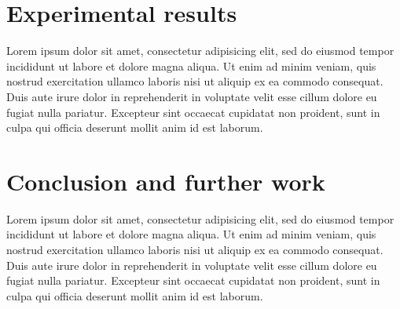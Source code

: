 \documentclass[times, utf8, seminar]{fer}
\begin{document}
\chapter{Experimental results}
Lorem ipsum dolor sit amet, consectetur adipisicing elit, sed do eiusmod tempor incididunt ut labore et dolore magna aliqua. Ut enim ad minim veniam, quis nostrud exercitation ullamco laboris nisi ut aliquip ex ea commodo consequat. Duis aute irure dolor in reprehenderit in voluptate velit esse cillum dolore eu fugiat nulla pariatur. Excepteur sint occaecat cupidatat non proident, sunt in culpa qui officia deserunt mollit anim id est laborum.
\chapter{Conclusion and further work}
Lorem ipsum dolor sit amet, consectetur adipisicing elit, sed do eiusmod tempor incididunt ut labore et dolore magna aliqua. Ut enim ad minim veniam, quis nostrud exercitation ullamco laboris nisi ut aliquip ex ea commodo consequat. Duis aute irure dolor in reprehenderit in voluptate velit esse cillum dolore eu fugiat nulla pariatur. Excepteur sint occaecat cupidatat non proident, sunt in culpa qui officia deserunt mollit anim id est laborum.
% 
% 
% 
\end{document}
